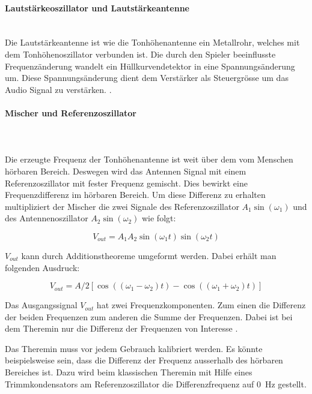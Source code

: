 \paragraph{Lautstärkeoszillator und Lautstärkeantenne}\mbox{}\\ 
Die Lautstärkeantenne ist wie die Tonhöhenantenne ein Metallrohr, welches mit dem Tonhöhenoszillator verbunden ist. Die durch den Spieler beeinflusste Frequenzänderung wandelt ein Hüllkurvendetektor in eine Spannungsänderung um. Diese Spannungsänderung dient dem Verstärker als Steuergrösse um das Audio Signal zu verstärken. \cite{Franzis}. 

\paragraph{Mischer und Referenzoszillator}\mbox{}\\ 
\\Die erzeugte Frequenz der Tonhöhenantenne ist weit über dem vom Menschen hörbaren Bereich. Deswegen wird das Antennen Signal mit einem Referenzoszillator mit fester Frequenz gemischt. Dies bewirkt eine Frequenzdifferenz im hörbaren Bereich.
Um diese Differenz zu erhalten multipliziert der Mischer die zwei Signale des Referenzoszillator $A_1\sin(\omega_1)$  und des Antennenoszillator $A_2\sin(\omega_2)$ wie folgt:

\begin{equation}
V_{out} = A_{1}A_{2} \sin(\omega_{1}t)   \sin(\omega_{2}t) 
\label{equ:mischer}
\end{equation}

$V_{out}$ kann durch Additionstheoreme umgeformt werden. Dabei erhält man folgenden Ausdruck:

\begin{equation}
V_{out} = A/2[\cos((\omega_{1}-\omega_{2})t)  - \cos((\omega_{1}+\omega_{2})t) ]
\label{equ:mischer_trigo}
\end{equation}

Das Ausgangssignal $V_{out}$ hat zwei Frequenzkomponenten. Zum einen die Differenz der beiden Frequenzen zum anderen die Summe der Frequenzen. Dabei ist bei dem Theremin nur die Differenz der Frequenzen von Interesse \cite{physik_theremin}.

Das Theremin muss vor jedem Gebrauch kalibriert werden. Es könnte beispielsweise sein, dass die Differenz der Frequenz ausserhalb des hörbaren Bereiches ist. Dazu wird beim klassischen Theremin mit Hilfe eines Trimmkondensators am Referenzoszillator die Differenzfrequenz auf \SI{0}{Hz} gestellt.

